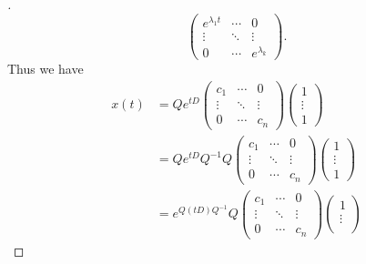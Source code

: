 \begin{proof}[]
\[\begin{pmatrix}
			e^{\lambda_1 t} & \cdots & 0             \\
			\vdots          & \ddots & \vdots        \\
			0               & \cdots & e^{\lambda_k}
		\end{pmatrix}.
	\]
	Thus we have
	\begin{align*}
		x(t) & = Q e^{tD} \begin{pmatrix}
			                  c_1    & \cdots & 0      \\
			                  \vdots & \ddots & \vdots \\
			                  0      & \cdots & c_n
		                  \end{pmatrix} \begin{pmatrix}
			                                1      \\
			                                \vdots \\
			                                1
		                                \end{pmatrix}                               \\
		     & = Q e^{tD} Q^{-1} Q \begin{pmatrix}
			                           c_1    & \cdots & 0      \\
			                           \vdots & \ddots & \vdots \\
			                           0      & \cdots & c_n
		                           \end{pmatrix} \begin{pmatrix}
			                                         1      \\
			                                         \vdots \\
			                                         1
		                                         \end{pmatrix}                      \\
		     & = e^{Q (tD) Q^{-1}} Q \begin{pmatrix}
			                             c_1    & \cdots & 0      \\
			                             \vdots & \ddots & \vdots \\
			                             0      & \cdots & c_n
		                             \end{pmatrix} \begin{pmatrix}
			                                           1      \\
			                                           \vdots \\

\end{pmatrix}
\end{align*}
\end{proof}
